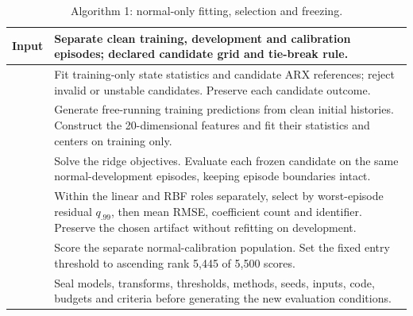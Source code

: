 \begin{table}[t]\centering
\caption{Algorithm 1: normal-only fitting, selection and freezing.}
\label{alg:fit}
\begin{tabular}{>{\raggedright\arraybackslash}p{}>{\raggedright\arraybackslash}p{}}\toprule
Input & Separate clean training, development and calibration episodes; declared candidate grid and tie-break rule.\\\midrule
1 & Fit training-only state statistics and candidate ARX references; reject invalid or unstable candidates. Preserve each candidate outcome.\\
2 & Generate free-running training predictions from clean initial histories. Construct the 20-dimensional features and fit their statistics and centers on training only.\\
3 & Solve the ridge objectives. Evaluate each frozen candidate on the same normal-development episodes, keeping episode boundaries intact.\\
4 & Within the linear and RBF roles separately, select by worst-episode residual $q_{.99}$, then mean RMSE, coefficient count and identifier. Preserve the chosen artifact without refitting on development.\\
5 & Score the separate normal-calibration population. Set the fixed entry threshold to ascending rank 5,445 of 5,500 scores.\\
6 & Seal models, transforms, thresholds, methods, seeds, inputs, code, budgets and criteria before generating the new evaluation conditions.\\\bottomrule
\end{tabular}
\end{table}

